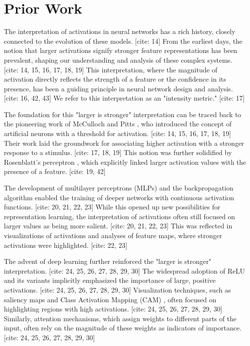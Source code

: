 \section{Prior Work}

The interpretation of activations in neural networks has a rich history, closely connected to the evolution of these models.  [cite: 14] From the earliest days, the notion that larger activations signify stronger feature representations has been prevalent, shaping our understanding and analysis of these complex systems. [cite: 14, 15, 16, 17, 18, 19] This interpretation, where the magnitude of activation directly reflects the strength of a feature or the confidence in its presence, has been a guiding principle in neural network design and analysis. [cite: 16, 42, 43] We refer to this interpretation as an "intensity metric." [cite: 17]

The foundation for this "larger is stronger" interpretation can be traced back to the pioneering work of McCulloch and Pitts \cite{mcculloch1943logical}, who introduced the concept of artificial neurons with a threshold for activation. [cite: 14, 15, 16, 17, 18, 19] Their work laid the groundwork for associating higher activation with a stronger response to a stimulus. [cite: 17, 18, 19] This notion was further solidified by Rosenblatt's perceptron \cite{rosenblatt1958perceptron}, which explicitly linked larger activation values with the presence of a feature. [cite: 19, 42]

The development of multilayer perceptrons (MLPs) and the backpropagation algorithm \cite{rumelhart1986learning} enabled the training of deeper networks with continuous activation functions. [cite: 20, 21, 22, 23] While this opened up new possibilities for representation learning, the interpretation of activations often still focused on larger values as being more salient. [cite: 20, 21, 22, 23] This was reflected in visualizations of activations and analyses of feature maps, where stronger activations were highlighted. [cite: 22, 23]

The advent of deep learning further reinforced the "larger is stronger" interpretation. [cite: 24, 25, 26, 27, 28, 29, 30] The widespread adoption of ReLU and its variants \cite{nair2010rectified,glorot2011deep,krizhevsky2012imagenet} implicitly emphasized the importance of large, positive activations. [cite: 24, 25, 26, 27, 28, 29, 30] Visualization techniques, such as saliency maps \cite{simonyan2013deep} and Class Activation Mapping (CAM) \cite{zhou2016learning}, often focused on highlighting regions with high activations. [cite: 24, 25, 26, 27, 28, 29, 30] Similarly, attention mechanisms, which assign weights to different parts of the input, often rely on the magnitude of these weights as indicators of importance. [cite: 24, 25, 26, 27, 28, 29, 30]

